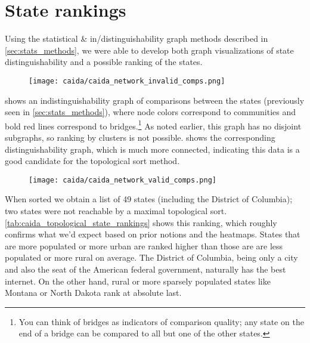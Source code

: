 \section{State rankings}

Using the statistical \& in/distinguishability graph methods described in \cref{sec:stats_methods}, we were able to develop both graph visualizations of state distinguishability and a possible ranking of the states.

\begin{figure}[h]
    \centering
    \texttt{[image: caida/caida\_network\_invalid\_comps.png]}
\end{figure}

 shows an indistinguishability graph of comparisons between the states (previously seen in \cref{sec:stats_methods}), where node colors correspond to communities and bold red lines correspond to bridges.\footnote{You can think of bridges as indicators of comparison quality; any state on the end of a bridge can be compared to all but one of the other states.} As noted earlier, this graph has no disjoint subgraphs, so ranking by clusters is not possible.  shows the corresponding distinguishability graph, which is much more connected, indicating this data is a good candidate for the topological sort method.

\begin{figure}[h]
    \centering
    \texttt{[image: caida/caida\_network\_valid\_comps.png]}
\end{figure}

When sorted we obtain a list of 49 states (including the District of Columbia); two states were not reachable by a maximal topological sort. \ref{tab:caida_topological_state_rankings} shows this ranking, which roughly confirms what we'd expect based on prior notions and the heatmaps. States that are more populated or more urban are ranked higher than those are are less populated or more rural on average. The District of Columbia, being only a city and also the seat of the American federal government, naturally has the best internet. On the other hand, rural or more sparsely populated states like Montana or North Dakota rank at absolute last.


